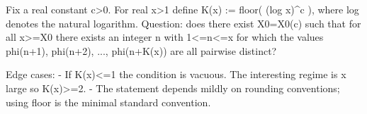 Fix a real constant c>0. For real x>1 define
  K(x) := floor( (log x)^c ),
where log denotes the natural logarithm.
Question: does there exist X0=X0(c) such that for all x>=X0 there exists an integer n with 1<=n<=x for which the values
  phi(n+1), phi(n+2), ..., phi(n+K(x))
are all pairwise distinct?

Edge cases:
- If K(x)<=1 the condition is vacuous. The interesting regime is x large so K(x)>=2.
- The statement depends mildly on rounding conventions; using floor is the minimal standard convention.
